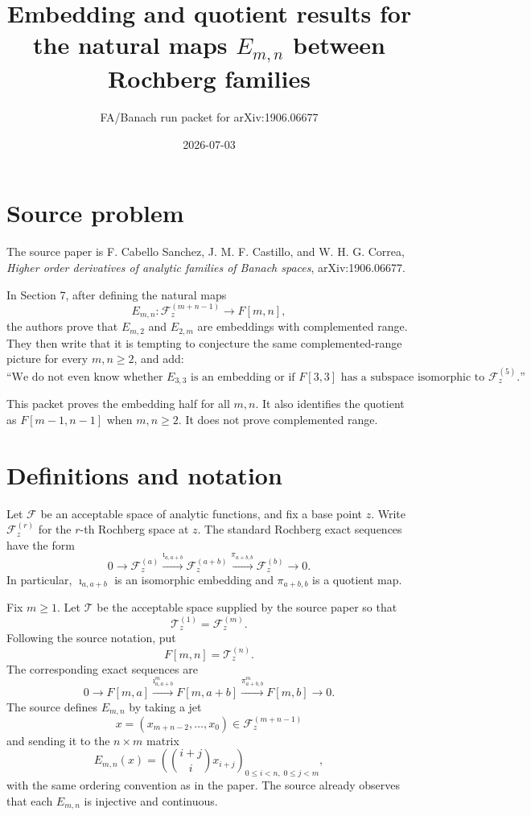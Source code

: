 \documentclass[11pt]{article}
\title{Embedding and quotient results for the natural maps \(E_{m,n}\) between Rochberg families}
\author{FA/Banach run packet for arXiv:1906.06677}
\date{2026-07-03}
\newcommand{\F}{\mathscr F}
\newcommand{\T}{\mathscr T}
\newcommand{\To}{\longrightarrow}
\begin{document}
\maketitle

\section*{Source problem}

The source paper is F. Cabello Sanchez, J. M. F. Castillo, and W. H. G. Correa,
\emph{Higher order derivatives of analytic families of Banach spaces}, arXiv:1906.06677.

In Section 7, after defining the natural maps
\[
  E_{m,n}:\F_z^{(m+n-1)} \To F[m,n],
\]
the authors prove that \(E_{m,2}\) and \(E_{2,m}\) are embeddings with complemented range.  They then write that it is tempting to conjecture the same complemented-range picture for every \(m,n\ge 2\), and add:
\[
\text{``We do not even know whether \(E_{3,3}\) is an embedding or if \(F[3,3]\) has a subspace isomorphic to \(\F_z^{(5)}\).''}
\]

This packet proves the embedding half for all \(m,n\).  It also identifies the quotient as \(F[m-1,n-1]\) when \(m,n\ge2\).  It does not prove complemented range.

\section*{Definitions and notation}

Let \(\F\) be an acceptable space of analytic functions, and fix a base point \(z\).  Write \(\F_z^{(r)}\) for the \(r\)-th Rochberg space at \(z\).  The standard Rochberg exact sequences have the form
\[
0\To \F_z^{(a)} \xrightarrow{\imath_{a,a+b}} \F_z^{(a+b)}
   \xrightarrow{\pi_{a+b,b}} \F_z^{(b)} \To 0.
\]
In particular, \(\imath_{a,a+b}\) is an isomorphic embedding and \(\pi_{a+b,b}\) is a quotient map.

Fix \(m\ge 1\).  Let \(\T\) be the acceptable space supplied by the source paper so that
\[
  \T_z^{(1)}=\F_z^{(m)}.
\]
Following the source notation, put
\[
  F[m,n]=\T_z^{(n)}.
\]
The corresponding exact sequences are
\[
0\To F[m,a]\xrightarrow{\imath^m_{a,a+b}} F[m,a+b]
  \xrightarrow{\pi^m_{a+b,b}} F[m,b]\To0.
\]
The source defines \(E_{m,n}\) by taking a jet
\[
  x=(x_{m+n-2},\ldots,x_0)\in \F_z^{(m+n-1)}
\]
and sending it to the \(n\times m\) matrix
\[
  E_{m,n}(x)=
  \left(\binom{i+j}{i}x_{i+j}\right)_{0\le i<n,\;0\le j<m},
\]
with the same ordering convention as in the paper.  The source already observes that each \(E_{m,n}\) is injective and continuous.
\end{document}
